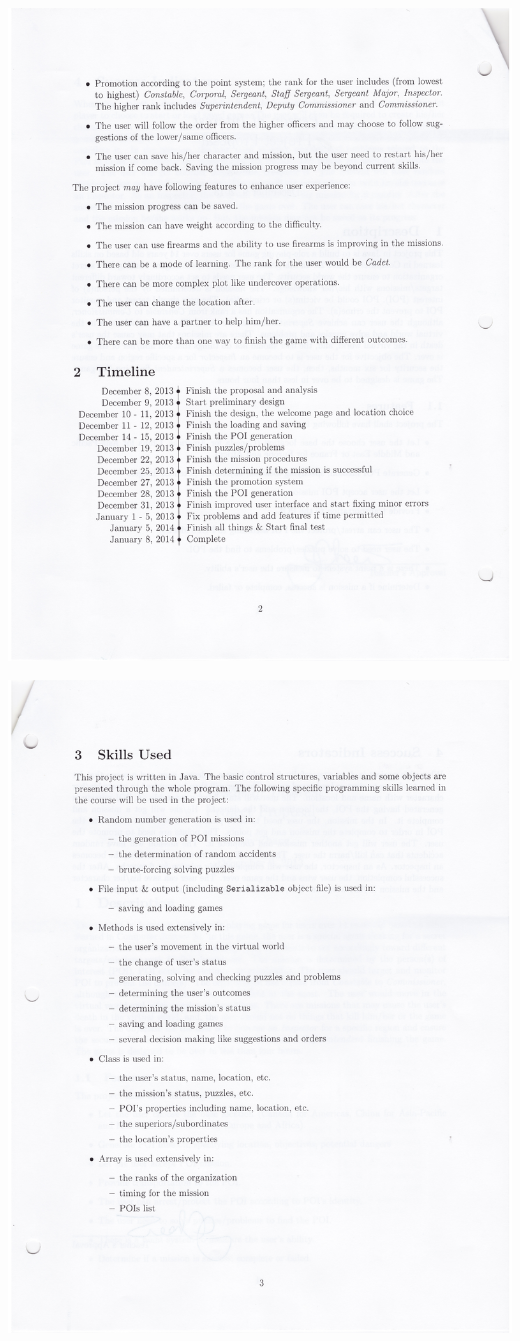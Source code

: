 \documentclass[letterpaper, 11pt]{report}
\begin{document}
\includegraphics[width=0.9\linewidth]{./img/prop-2}

\includegraphics[width=0.9\linewidth]{./img/prop-3}
\end{document}
